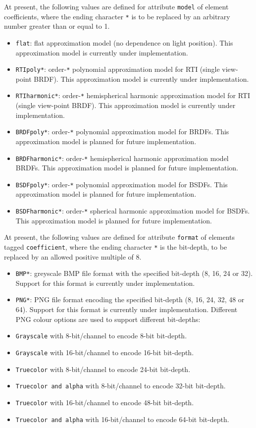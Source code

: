 At present, the following values are defined for attribute
\texttt{model} of element coefficients, where the ending character
\texttt{*} is to be replaced by an arbitrary number greater than or
equal to 1.
\begin{itemize}
\item \texttt{flat}: flat approximation model (no dependence on
light position). This approximation model is currently under
implementation.
\item \texttt{RTIpoly*}: order-\texttt{*} polynomial
approximation model for RTI (single view-point BRDF). This approximation
model is currently under implementation.
\item \texttt{RTIharmonic*}:
order-\texttt{*} hemispherical harmonic approximation model for RTI
(single view-point BRDF). This approximation model is currently under
implementation.
\item \texttt{BRDFpoly*}: order-\texttt{*} polynomial
approximation model for BRDFs. This approximation model is planned for
future implementation.
\item \texttt{BRDFharmonic*}: order-\texttt{*}
hemispherical harmonic approximation model BRDFs. This approximation
model is planned for future implementation.
\item \texttt{BSDFpoly*}:
order-\texttt{*} polynomial approximation model for BSDFs. This
approximation model is planned for future implementation.
\item \texttt{BSDFharmonic*}: order-\texttt{*} spherical harmonic
approximation model for BSDFs. This approximation model is planned for
future implementation.
\end{itemize}

At present, the following values are defined for attribute
\texttt{format} of elements tagged \texttt{coefficient}, where the
ending character \texttt{*} is the bit-depth, to be replaced by an
allowed positive multiple of 8.
\begin{itemize}
\item \texttt{BMP*}: greyscale BMP file
format with the specified bit-depth (8, 16, 24 or 32). Support for this
format is currently under implementation.
\item \texttt{PNG*}: PNG file
format encoding the specified bit-depth (8, 16, 24, 32, 48 or 64).
Support for this format is currently under implementation. Different PNG
colour options are used to support different bit-depths:
\item \texttt{Grayscale} with 8-bit/channel to encode 8-bit bit-depth.
\item \texttt{Grayscale} with 16-bit/channel to encode 16-bit bit-depth.
\item \texttt{Truecolor} with 8-bit/channel to encode 24-bit bit-depth.
\item \texttt{Truecolor\ and\ alpha} with 8-bit/channel to encode 32-bit
bit-depth.
\item \texttt{Truecolor} with 16-bit/channel to encode 48-bit
bit-depth.
\item \texttt{Truecolor\ and\ alpha} with 16-bit/channel to
encode 64-bit bit-depth.
\end{itemize}
